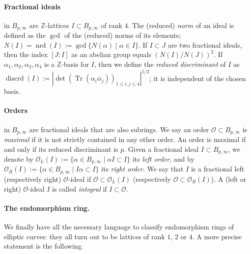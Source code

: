 \documentclass[10pt]{article}
\theoremstyle{plain}
\theoremstyle{definition}
\DeclareMathOperator{\Tr}{Tr} %
\DeclareMathOperator{\nrd}{nrd} %
\DeclareMathOperator{\discrd}{discrd} %
\def\Z{\ensuremath{\mathbb{Z}}}
\def\O{\ensuremath{\mathcal{O}}}
\begin{document}
\begin{prposition}
\paragraph{Fractional ideals} in $B_{p,\infty}$ are $\Z$-lattices
$I\subset B_{p,\infty}$ of rank $4$.
The (reduced) \emph{norm} of an ideal is defined as the
$\gcd$ of the (reduced) norms of its elements;
$N(I) = \nrd(I) := \gcd\{N(\alpha)\mid\alpha\in I\}$.
If $I\subset J$ are two fractional ideals, then the index $[J:I]$ as
an abelian group equals $\left(N(I)/N(J)\right)^2$.
If $\alpha_1,\alpha_2,\alpha_3,\alpha_4$ is a $\Z$-basis for $I$, then
we define the \emph{reduced discriminant} of $I$ as $\discrd(I) :=
|\det(\Tr(\alpha_i\overline{\alpha_j}))_{1\leq i,j\leq 4}|^{1/2}$;
it is independent of the chosen basis.

\paragraph{Orders} in $B_{p,\infty}$ are fractional ideals that are also
subrings. We say an order $\O\subset B_{p,\infty}$ is \emph{maximal} if
it is not strictly contained in any other order. An order is maximal
if and only if its reduced discriminant is $p$.
Given a fractional ideal $I\subset B_{p,\infty}$,
we denote by $\O_L(I):=\{\alpha\in B_{p,\infty}\mid \alpha I\subset I\}$
its \emph{left order},
and by $\O_R(I):=\{\alpha\in B_{p,\infty}\mid I\alpha\subset I\}$
its \emph{right order}.
We say that $I$ is a fractional left (respectively right) $\O$-ideal if
$\O\subset\O_L(I)$ (respectively $\O\subset\O_R(I)$).
A (left or right) $\O$-ideal $I$ is called \emph{integral} if $I\subset\O$.



\paragraph{The endomorphism ring.}
We finally have all the necessary language to classify endomorphism
rings of elliptic curves: they all turn out to be lattices of
rank $1$, $2$ or $4$. A more precise statement is the following.


\end{prposition}
\end{document}
